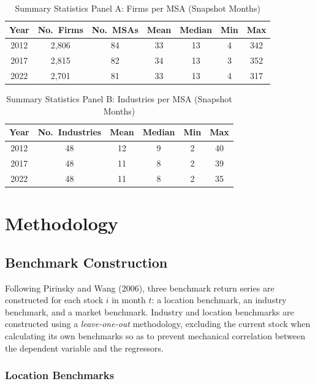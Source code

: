 \documentclass[
  12pt,
]{article}
\begin{document}
\begin{table}[!h]
\centering
\caption{\label{tab:table1-panel-a}Summary Statistics Panel A: Firms per MSA (Snapshot Months)}
\centering
\fontsize{10}{12}\selectfont
\begin{tabular}[t]{ccccccc}
\toprule
Year & No.\ Firms & No.\ MSAs & Mean & Median & Min & Max\\
\midrule
2012 & 2,806 & 84 & 33 & 13 & 4 & 342\\
2017 & 2,815 & 82 & 34 & 13 & 3 & 352\\
2022 & 2,701 & 81 & 33 & 13 & 4 & 317\\
\bottomrule
\end{tabular}
\end{table}

\begin{table}[!h]
\centering
\caption{\label{tab:table1-panel-b}Summary Statistics Panel B: Industries per MSA (Snapshot Months)}
\centering
\fontsize{10}{12}\selectfont
\begin{tabular}[t]{cccccc}
\toprule
Year & No.\ Industries & Mean & Median & Min & Max\\
\midrule
2012 & 48 & 12 & 9 & 2 & 40\\
2017 & 48 & 11 & 8 & 2 & 39\\
2022 & 48 & 11 & 8 & 2 & 35\\
\bottomrule
\end{tabular}
\end{table}

\section{Methodology}\label{methodology}

\subsection{Benchmark Construction}\label{benchmark-construction}

Following Pirinsky and Wang (2006), three benchmark return series are
constructed for each stock \(i\) in month \(t\): a location benchmark,
an industry benchmark, and a market benchmark. Industry and location
benchmarks are constructed using a \emph{leave-one-out} methodology,
excluding the current stock when calculating its own benchmarks so as to
prevent mechanical correlation between the dependent variable and the
regressors.

\subsubsection{Location Benchmarks}\label{location-benchmarks}
\end{document}

